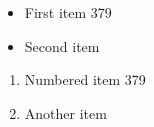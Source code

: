 \documentclass{article}
\begin{document}
\begin{itemize}
\item First item 379
\item Second item
\end{itemize}
\begin{enumerate}
\item Numbered item 379
\item Another item
\end{enumerate}
\end{document}
